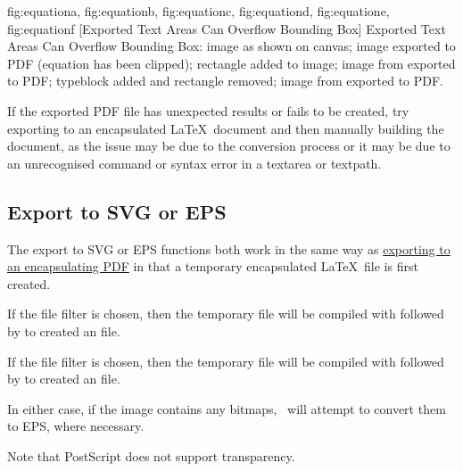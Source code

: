{
 {fig:equationa}{}{},
 {fig:equationb}{}{},
 {fig:equationc}{}{},
 {fig:equationd}{}{},
 {fig:equatione}{}{},
 {fig:equationf}{}{}
}
[Exported Text Areas Can Overflow Bounding Box]
{Exported Text Areas Can Overflow Bounding Box:
 image as shown on canvas;
 image exported to PDF (equation has been clipped);
 rectangle added to image;
 image from  exported to PDF;
 typeblock added and rectangle removed;
 image from  exported to PDF.}

If the exported PDF file has unexpected results or fails to be
created, try exporting to an encapsulated \LaTeX\ document and then
manually building the document, as the issue may be due to the
conversion process or it may be due to an unrecognised command or
syntax error in a \gls{textarea} or \gls{textpath}.


\subsection{Export to SVG or EPS}\label{sec:exportsvgeps}

The export to SVG or EPS functions both work in the same way
as \hyperref[sec:exportdoc]{exporting to an encapsulating PDF}
in that a temporary encapsulated \LaTeX\ file is first created.

If the  file filter is chosen, then the temporary
file will be compiled with  followed by
 to created an   file.

If the  file filter is chosen, then the temporary
file will be compiled with  followed by
 to created an  file.

In either case, if the image contains any
\glspl{bitmap}, \FlowframTk\ will attempt to convert
them to EPS, where necessary.

\begin{important}
Note that PostScript does not support transparency.
\end{important}

